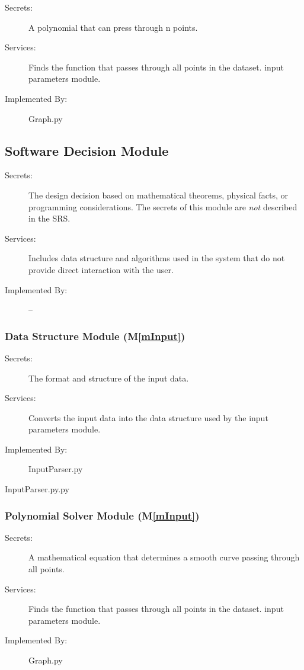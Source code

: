 \documentclass[12pt, titlepage]{article}
\newcommand{\mref}[1]{M\ref{#1}}
\begin{document}
\begin{description}
\item[Secrets:]A polynomial that can press through n points.  
\item[Services:]Finds the function that passes through all points in the dataset. 
  input parameters module.
\item[Implemented By:] Graph.py
\end{description}


\subsection{Software Decision Module}

\begin{description}
\item[Secrets:] The design decision based on mathematical theorems, physical
  facts, or programming considerations. The secrets of this module are
  \emph{not} described in the SRS.
\item[Services:] Includes data structure and algorithms used in the system that
  do not provide direct interaction with the user. 
\item[Implemented By:] --
\end{description}

\subsubsection{Data Structure Module (\mref{mInput})}
\begin{description}
\item[Secrets:]The format and structure of the input data.
\item[Services:]Converts the input data into the data structure used by the
  input parameters module.
\item[Implemented By:] InputParser.py
\end{description}InputParser.py.py

\subsubsection{Polynomial Solver Module (\mref{mInput})}
\begin{description}
\item[Secrets:]A mathematical equation that determines a smooth curve passing through all points.
\item[Services:]Finds the function that passes through all points in the dataset. 
  input parameters module.
\item[Implemented By:] Graph.py
\end{description}
\end{document}

